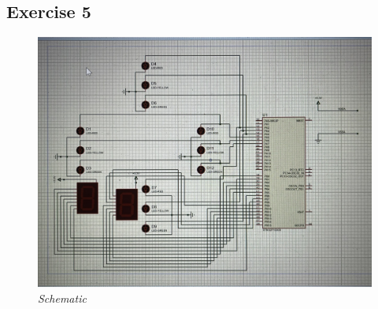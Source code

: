 \subsection{Exercise 5}
\begin{figure}[!htp]
    \centering
    \includegraphics[width=5in]{source/picture/bai_1/pic5.jpg}
    \caption{\textit{Schematic}}
    \label{bai1_pic3}
\end{figure}
